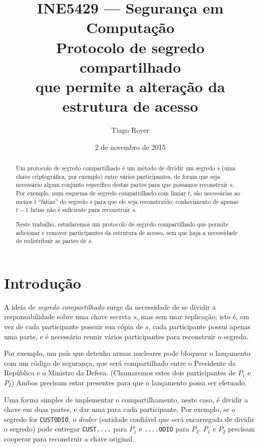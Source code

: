 \documentclass[10pt,twocolumn]{article}
\theoremstyle{definition}
\begin{document}
\title{
    INE5429 --- Segurança em Computação \\[1ex]
    Protocolo de segredo compartilhado \\
    que permite a alteração da estrutura de acesso \\[1ex]
}
\author{Tiago Royer}
\date{2 de novembro de 2015}
\maketitle

\begin{abstract}
    Um protocolo de segredo compartilhado
    é um método de dividir um segredo $s$
    (uma chave criptográfica, por exemplo)
    entre vários participantes,
    de forma que seja necessário algum conjunto específico destas partes
    para que possamos reconstruir $s$.
    Por exemplo,
    num esquema de segredo compatrilhado com limiar $t$,
    são necessárias ao menos $t$ ``fatias'' do segredo $s$
    para que ele seja reconstruído;
    conhecimento de apenas $t-1$ fatias não é suficiente para reconstruir $s$.

    Neste trabalho,
    estudaremos um protocolo de segredo compartilhado
    que permite adicionar e remover participantes da estrutura de acesso,
    sem que haja a necessidade de redistribuir as partes de $s$.
\end{abstract}

\section{Introdução}

A ideia de \emph{segredo compartilhado}
surge da necessidade de se dividir a responsabilidade sobre uma chave secreta $s$,
mas sem usar replicação;
isto é,
em vez de cada participante possuir sua cópia de $s$,
cada participante possui apenas uma parte,
e é necessário reunir vários participantes para reconstruir o segredo.

Por exemplo,
um país que detenha armas nucleares
pode bloquear o lançamento com um código de segurança,
que será compartilhado entre o Presidente da República e o Ministro da Defesa.
(Chamaremos estes dois participantes de $P_1$ e $P_2$)
Ambos precisam estar presentes para que o lançamento possa ser efetuado.

Uma forma simples de implementar o compartilhamento, neste caso,
é dividir a chave em duas partes,
e dar uma para cada participante.
Por exemplo,
se o segredo for \texttt{CUSTODIO},
o \emph{dealer}
(entidade confiável que será encarregada de dividir o segredo)
pode entregar \texttt{CUST....} para $P_1$
e \texttt{....ODIO} para $P_2$.
$P_1$ e $P_2$ precisam cooperar para reconstruir a chave original.
\end{document}
